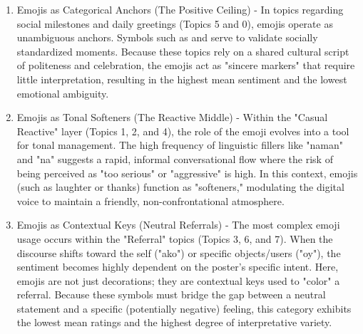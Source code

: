 \begin{enumerate}
	\item Emojis as Categorical Anchors (The Positive Ceiling) - In topics regarding social milestones and daily greetings (Topics 5 and 0), emojis operate as unambiguous anchors. Symbols such as  and  serve to validate socially standardized moments. Because these topics rely on a shared cultural script of politeness and celebration, the emojis act as "sincere markers" that require little interpretation, resulting in the highest mean sentiment and the lowest emotional ambiguity.
	\item Emojis as Tonal Softeners (The Reactive Middle) - Within the "Casual Reactive" layer (Topics 1, 2, and 4), the role of the emoji evolves into a tool for tonal management. The high frequency of linguistic fillers like "naman" and "na" suggests a rapid, informal conversational flow where the risk of being perceived as "too serious" or "aggressive" is high. In this context, emojis (such as laughter or thanks) function as "softeners," modulating the digital voice to maintain a friendly, non-confrontational atmosphere.
	\item Emojis as Contextual Keys (Neutral Referrals) - The most complex emoji usage occurs within the "Referral" topics (Topics 3, 6, and 7). When the discourse shifts toward the self ("ako") or specific objects/users ("oy"), the sentiment becomes highly dependent on the poster’s specific intent. Here, emojis are not just decorations; they are contextual keys used to "color" a referral. Because these symbols must bridge the gap between a neutral statement and a specific (potentially negative) feeling, this category exhibits the lowest mean ratings and the highest degree of interpretative variety.
\end{enumerate}

